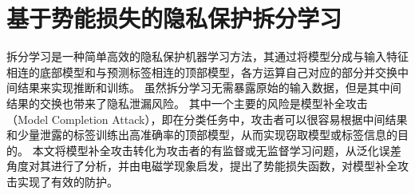 \chapter{基于势能损失的隐私保护拆分学习}
拆分学习是一种简单高效的隐私保护机器学习方法，其通过将模型分成与输入特征相连的底部模型和与预测标签相连的顶部模型，各方运算自己对应的部分并交换中间结果来实现推断和训练。
%
虽然拆分学习无需暴露原始的输入数据，但是其中间结果的交换也带来了隐私泄漏风险。
%
其中一个主要的风险是模型补全攻击（Model Completion Attack），即在分类任务中，攻击者可以很容易根据中间结果和少量泄露的标签训练出高准确率的顶部模型，从而实现窃取模型或标签信息的目的。
%
本文将模型补全攻击转化为攻击者的有监督或无监督学习问题，从泛化误差角度对其进行了分析，并由电磁学现象启发，提出了势能损失函数，对模型补全攻击实现了有效的防护。
%





